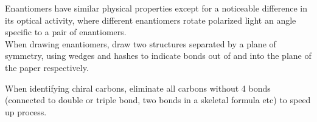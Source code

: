 \documentclass[../main]{subfiles}
\begin{document}
	Enantiomers have similar physical properties except for a noticeable difference in its optical activity, where different enantiomers rotate polarized light an angle specific to a pair of enantiomers. \\

	When drawing enantiomers, draw two structures separated by a plane of symmetry, using wedges and hashes to indicate bonds out of and into the plane of the paper respectively.


	When identifying chiral carbons, eliminate all carbons without 4 bonds (connected to double or triple bond, two bonds in a skeletal formula etc) to speed up process.

\end{document}
